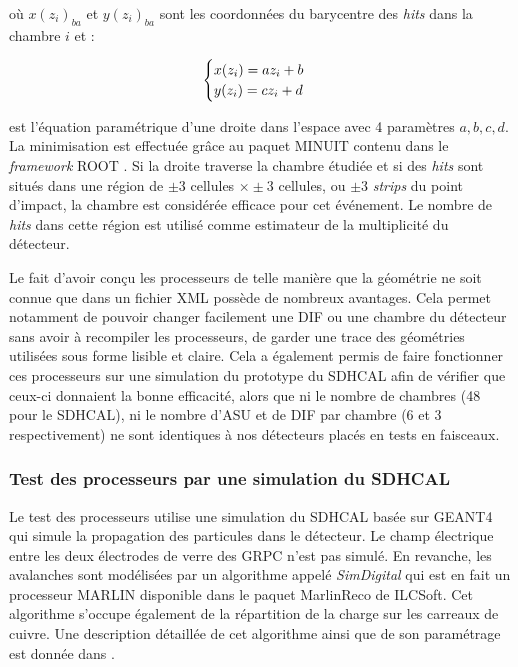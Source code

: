 \begin{itemize}[label=$\bullet$]
	où $x(z_{i})_{ba}$ et $y(z_{i})_{ba}$ sont les coordonnées du barycentre des \textit{hits} dans la chambre $i$ et :
	
\begin{equation}
\begin{cases}
\strut x(z_i)=az_i+b\\
y(z_i)=cz_i+d
\end{cases}
\end{equation}

est l'équation paramétrique d'une droite dans l'espace avec \num{4} paramètres $a,b,c,d$. La minimisation est effectuée grâce au paquet MINUIT \cite{James:2004xla} contenu dans le \textit{framework} ROOT \cite{BRUN199781}.
Si la droite traverse la chambre étudiée et si des \textit{hits} sont situés dans une région de $\pm 3$ cellules $\times\pm 3$ cellules, ou $\pm 3$ \textit{strips} du point d'impact, la chambre est considérée efficace pour cet événement. Le nombre de \textit{hits} dans cette région est utilisé comme estimateur de la multiplicité du détecteur.
\end{itemize}

Le fait d'avoir conçu les processeurs de telle manière que la géométrie ne soit connue que dans un fichier XML possède de nombreux avantages. Cela permet notamment de pouvoir changer facilement une DIF ou une chambre du détecteur sans avoir à recompiler les processeurs, de garder une trace des géométries utilisées sous forme lisible et claire. Cela a également permis de faire fonctionner ces processeurs sur une simulation du prototype du SDHCAL afin de vérifier que ceux-ci donnaient la bonne efficacité, alors que ni le nombre de chambres (\num{48} pour le SDHCAL), ni le nombre d'ASU et de DIF par chambre (\num{6} et \num{3} respectivement) ne sont identiques à nos détecteurs placés en tests en faisceaux.

\subsubsection{Test des processeurs par une simulation du SDHCAL}
Le test des processeurs utilise une simulation du SDHCAL basée sur GEANT4\cite{AGOSTINELLI2003250} qui simule la propagation des particules dans le détecteur. Le champ électrique entre les deux électrodes de verre des GRPC n'est pas simulé. En revanche, les avalanches sont modélisées par un algorithme appelé \textit{SimDigital} qui est en fait un processeur MARLIN disponible dans le paquet MarlinReco \cite{2007Prama} de ILCSoft. Cet algorithme s'occupe également de la répartition de la charge sur les carreaux de cuivre. Une description détaillée de cet algorithme ainsi que de son paramétrage est donnée dans \cite{steen:tel-01282680}.

